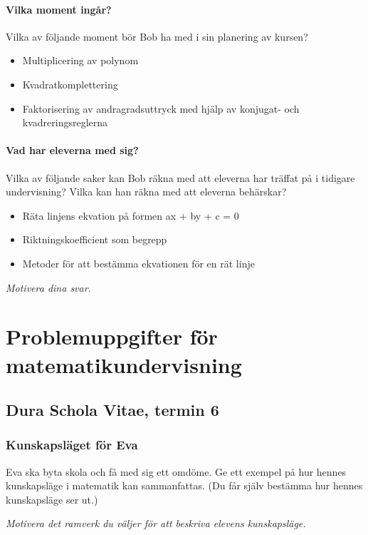 \subsection{Vilka moment ingår?}
Vilka av följande moment bör Bob ha med i sin planering av kursen?

\begin{itemize}
  \item Multiplicering av polynom
  \item Kvadratkomplettering
  \item Faktorisering av andragradsuttryck med hjälp av konjugat- och kvadreringsreglerna
\end{itemize}

\subsection{Vad har eleverna med sig?}
Vilka av följande saker kan Bob räkna med att eleverna har träffat på i tidigare undervisning? Vilka kan han räkna med att eleverna behärskar?

\begin{itemize}
  \item Räta linjens ekvation på formen ax + by + c = 0
  \item Riktningskoefficient som begrepp
  \item Metoder för att bestämma ekvationen för en rät linje
\end{itemize}

\noindent \emph{Motivera dina svar.}



\newpage
\part*{Problemuppgifter för matematikundervisning}

\chapter{Dura Schola Vitae, termin 6}

\section{Kunskapsläget för Eva}
Eva ska byta skola och få med sig ett omdöme. Ge ett exempel på hur hennes kunskapsläge i matematik kan sammanfattas. (Du får själv bestämma hur hennes kunskapsläge ser ut.)

\noindent \emph{Motivera det ramverk du väljer för att beskriva elevens kunskapsläge.}
